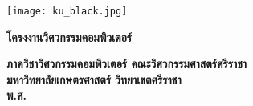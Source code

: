 \begin{center}
\texttt{[image: ku\_black.jpg]}

{\fontsize{35pt}{37pt}\selectfont\bfseries โครงงานวิศวกรรมคอมพิวเตอร์}

\vspace{0.3in}
{\fontsize{20pt}{22pt}\selectfont\bfseries

}
\vfill
{\fontsize{20pt}{22pt}\selectfont\bfseries
}
\vfill
{\fontsize{20pt}{22pt}\selectfont\bfseries ภาควิชาวิศวกรรมคอมพิวเตอร์ คณะวิศวกรรมศาสตร์ศรีราชา\\
มหาวิทยาลัยเกษตรศาสตร์ วิทยาเขตศรีราชา\\
พ.ศ. \thisYear}\\
\end{center}
